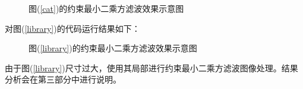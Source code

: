 \documentclass[UTF8]{ctexart}
\begin{document}
\begin{figure}[htbp]
{        }
        \caption{图(\ref{cat})的约束最小二乘方滤波效果示意图}
        \label{catlimitmin2}
    \end{figure}
    \clearpage
    对图(\ref{library})的代码运行结果如下：
    \begin{figure}[htbp]
        \centering
        \caption{图(\ref{library})的约束最小二乘方滤波效果示意图}
        \label{librarylimitmin2}
    \end{figure}

    由于图(\ref{library})尺寸过大，使用其局部进行约束最小二乘方滤波图像处理。结果分析会在第三部分中进行说明。
\end{document}
